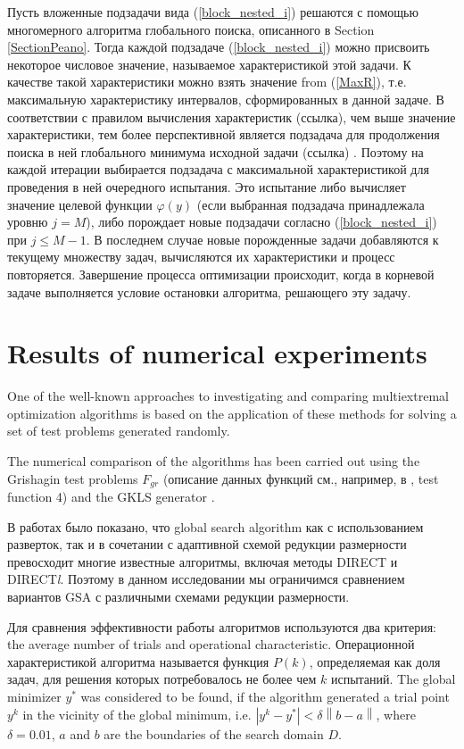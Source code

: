 \documentclass[runningheads]{llncs}
\begin{document}
Пусть вложенные подзадачи вида (\ref{block_nested_i}) решаются с помощью многомерного алгоритма глобального поиска, описанного в Section \ref{SectionPeano}. Тогда каждой подзадаче (\ref{block_nested_i}) можно присвоить некоторое числовое
значение, называемое характеристикой этой задачи. К качестве такой характеристики можно взять значение from (\ref{MaxR}), т.е. максимальную характеристику интервалов, сформированных в данной задаче. В соответствии с правилом вычисления характеристик (ссылка), чем выше значение характеристики, тем более перспективной является подзадача для продолжения поиска в ней глобального минимума исходной задачи (ссылка)  . Поэтому на каждой итерации выбирается подзадача с максимальной характеристикой для проведения в ней очередного испытания. Это испытание либо вычисляет значение целевой функции $\varphi(y)$ (если выбранная подзадача принадлежала уровню $j=M$), либо порождает новые подзадачи согласно (\ref{block_nested_i}) при $j\leq M-1$. В последнем случае новые порожденные задачи добавляются к текущему множеству задач, вычисляются их характеристики и процесс повторяется. Завершение процесса оптимизации происходит, когда в корневой задаче выполняется условие остановки алгоритма, решающего эту задачу.

\section{Results of numerical experiments}

One of the well-known approaches to investigating and comparing multiextremal optimization algorithms is based on the application of these methods for solving a set of test problems generated randomly.

The numerical comparison of the algorithms has been carried out using the Grishagin test problems $F_{gr}$ (описание данных функций см., например, в \cite{Grishagin1994}, test function 4) and the GKLS generator \cite{Gaviano2003}.

В работах \cite{Barkalov2015,Grishagin2018} было показано, что global search algorithm как с использованием разверток, так и в сочетании с адаптивной схемой редукции размерности превосходит многие известные алгоритмы, включая методы DIRECT и DIRECT\textit{l}. Поэтому в данном исследовании мы ограничимся сравнением вариантов GSA с различными схемами редукции размерности.

Для сравнения эффективности работы алгоритмов используются два критерия: the average number of trials and operational characteristic.
Операционной характеристикой алгоритма называется функция $P(k)$, определяемая как доля задач, для решения которых потребовалось не более чем $k$ испытаний.
The global minimizer $y^\ast$ was considered to be found, if the algorithm generated a trial point $y^k$ in the vicinity of the global minimum, i.e. $\left|y^k-y^\ast\right| < \delta \left\|b-a\right\|$, where $\delta = 0.01$, $a$ and $b$ are the boundaries of the search domain $D$.
\end{document}
